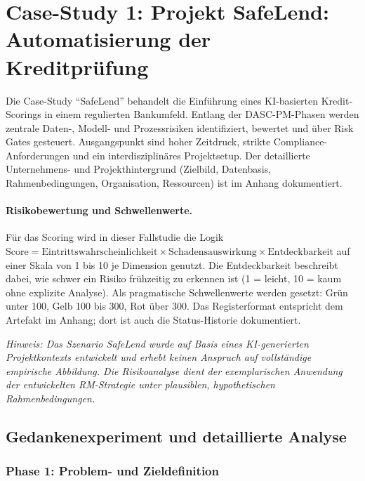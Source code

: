 \section{Case-Study 1: Projekt SafeLend: Automatisierung der Kreditprüfung} \label{sec:case_study_1}

Die Case-Study \enquote{SafeLend} behandelt die Einführung eines KI-basierten
Kredit-Scorings in einem regulierten Bankumfeld.
Entlang der DASC-PM-Phasen werden zentrale Daten-, Modell- und Prozessrisiken
identifiziert, bewertet und über Risk Gates gesteuert.
Ausgangspunkt sind hoher Zeitdruck, strikte Compliance-Anforderungen
und ein interdisziplinäres Projektsetup.
Der detaillierte Unternehmens- und Projekthintergrund (Zielbild, Datenbasis,
Rahmenbedingungen, Organisation, Ressourcen) ist im Anhang dokumentiert.

\paragraph*{Risikobewertung und Schwellenwerte.}
Für das Scoring wird in dieser Fallstudie die Logik
$\text{Score} = \text{Eintrittswahrscheinlichkeit} \times \text{Schadensauswirkung} \times \text{Entdeckbarkeit}$
auf einer Skala von 1 bis 10 je Dimension genutzt.
Die Entdeckbarkeit beschreibt dabei, wie schwer ein Risiko frühzeitig zu erkennen ist
(1 = leicht, 10 = kaum ohne explizite Analyse).
Als pragmatische Schwellenwerte werden gesetzt: Grün unter 100, Gelb 100 bis 300, Rot über 300.
Das Registerformat entspricht dem Artefakt im Anhang; dort ist auch die Status-Historie dokumentiert.

\medskip
\noindent\textit{Hinweis: Das Szenario SafeLend wurde auf Basis eines KI-generierten Projektkontexts entwickelt
und erhebt keinen Anspruch auf vollständige empirische Abbildung.
Die Risikoanalyse dient der exemplarischen Anwendung der entwickelten RM-Strategie
unter plausiblen, hypothetischen Rahmenbedingungen.}

\subsection{Gedankenexperiment und detaillierte Analyse}

\subsubsection{Phase 1: Problem- und Zieldefinition}
